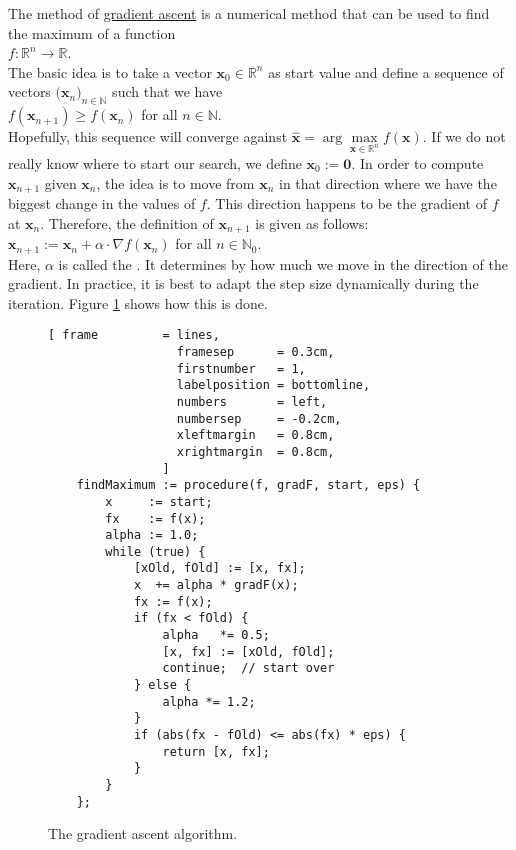 The method of \href{https://en.wikipedia.org/wiki/Gradient_descent}{gradient ascent} is a numerical
method that can be used to find the maximum of a function 
\\[0.2cm]
\hspace*{1.3cm}
$f: \mathbb{R}^n \rightarrow \mathbb{R}$.
\\[0.2cm]
The basic idea is to take a vector $\mathbf{x}_0 \in \mathbb{R}^n$ as start value and define a sequence of
vectors $\bigl(\mathbf{x}_n\bigr)_{n\in\mathbb{N}}$ such that we have
\\[0.2cm]
\hspace*{1.3cm}
$f(\mathbf{x}_{n+1}) \geq f(\mathbf{x}_{n})$ \quad for all $n\in\mathbb{N}$.
\\[0.2cm]
Hopefully, this sequence will converge against $\widehat{\mathbf{x}} = \arg\max\limits_{\mathbf{x}\in \mathbb{R}^n}f(\mathbf{x})$.
If we do not really know where to start our search, we define $\mathbf{x}_0 := \mathbf{0}$.  In order to
compute $\mathbf{x}_{n+1}$ given $\mathbf{x}_{n}$, the idea is to move from $\mathbf{x}_n$ in that direction
where we have the biggest change in the values of $f$.   This direction happens to be the gradient of $f$ at $\mathbf{x}_n$.
Therefore, the definition of $\mathbf{x}_{n+1}$ is given as follows:
\\[0.2cm]
\hspace*{1.3cm}
$\mathbf{x}_{n+1} := \mathbf{x}_n + \alpha \cdot \nabla f(\mathbf{x}_n)$ \quad for all $n \in \mathbb{N}_0$.
\\[0.2cm]
Here, $\alpha$ is called the .  It determines by how much we move in the direction of the gradient.
In practice, it is best to adapt the step size dynamically during the iteration.  Figure
\ref{fig:gradient-ascent.stlx} shows how this is done.



\begin{figure}[!ht]
\centering
\begin{Verbatim}[ frame         = lines, 
                  framesep      = 0.3cm, 
                  firstnumber   = 1,
                  labelposition = bottomline,
                  numbers       = left,
                  numbersep     = -0.2cm,
                  xleftmargin   = 0.8cm,
                  xrightmargin  = 0.8cm,
                ]
    findMaximum := procedure(f, gradF, start, eps) {
        x     := start;
        fx    := f(x);
        alpha := 1.0;
        while (true) {
            [xOld, fOld] := [x, fx];
            x  += alpha * gradF(x);
            fx := f(x);
            if (fx < fOld) {   
                alpha   *= 0.5;
                [x, fx] := [xOld, fOld];
                continue;  // start over
            } else {
                alpha *= 1.2;
            }
            if (abs(fx - fOld) <= abs(fx) * eps) {
                return [x, fx];
            } 
        }
    };
\end{Verbatim}
\vspace*{-0.3cm}
\caption{The gradient ascent algorithm.}
\label{fig:gradient-ascent.stlx}
\end{figure}


